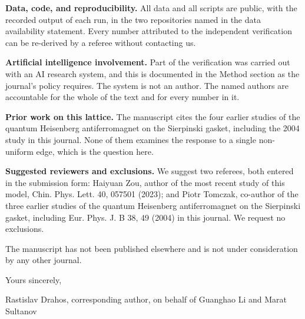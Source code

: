 \documentclass[11pt]{article}
\begin{document}
\textbf{Data, code, and reproducibility.} All data and all scripts are public, with the recorded output of each run, in the two repositories named in the data availability statement. Every number attributed to the independent verification can be re-derived by a referee without contacting us.

\textbf{Artificial intelligence involvement.} Part of the verification was carried out with an AI research system, and this is documented in the Method section as the journal's policy requires. The system is not an author. The named authors are accountable for the whole of the text and for every number in it.

\textbf{Prior work on this lattice.} The manuscript cites the four earlier studies of the quantum Heisenberg antiferromagnet on the Sierpinski gasket, including the 2004 study in this journal. None of them examines the response to a single non-uniform edge, which is the question here.

\textbf{Suggested reviewers and exclusions.} We suggest two referees, both entered in the submission form: Haiyuan Zou, author of the most recent study of this model, Chin. Phys. Lett. 40, 057501 (2023); and Piotr Tomczak, co-author of the three earlier studies of the quantum Heisenberg antiferromagnet on the Sierpinski gasket, including Eur. Phys. J. B 38, 49 (2004) in this journal. We request no exclusions.

The manuscript has not been published elsewhere and is not under consideration by any other journal.

Yours sincerely,

Rastislav Drahos, corresponding author, on behalf of Guanghao Li and Marat Sultanov
\end{document}

